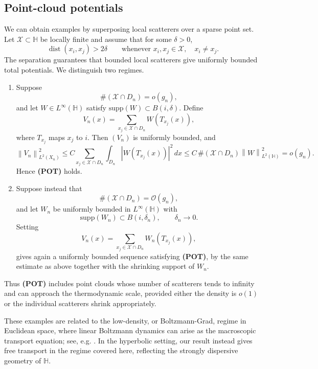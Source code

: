 \documentclass[11pt,twoside,reqno]{amsart}
\newcommand{\dist}{\operatorname{dist}}
\newcommand{\1}{\mathrm{\mathbf{1}}}
\newcommand{\supp}{\mathrm{supp}}
\newcommand{\norm}[1]{\left\lVert#1\right\rVert}
\numberwithin{equation}{section}
\theoremstyle{plain}
\theoremstyle{definition}
\theoremstyle{remark}
\begin{document}
\subsection{Point-cloud potentials}

We can obtain examples by superposing local scatterers over a sparse point
set. Let $\mathcal X\subset\mathbb H$ be locally finite and assume that for
some $\delta>0$,
\[
    \dist(x_i,x_j)>2\delta
    \qquad
    \text{whenever }x_i,x_j\in\mathcal X,\quad x_i\neq x_j.
\]
The separation guarantees that bounded local scatterers give uniformly
bounded total potentials. We distinguish two regimes.

\begin{enumerate}
    \item
    Suppose
    \[
        \#(\mathcal X\cap D_n)=o(g_n),
    \]
    and let $W\in L^\infty(\mathbb H)$ satisfy
    $\supp(W)\subset B(i,\delta)$. Define
    \[
        V_n(x)
        =
        \sum_{x_j\in\mathcal X\cap D_n}
        W(T_{x_j}(x)),
    \]
    where $T_{x_j}$ maps $x_j$ to $i$. Then $(V_n)$ is uniformly bounded,
    and
    \begin{equation}
        \norm{V_n}_{L^2(X_n)}^2
        \leq
        C
        \sum_{x_j\in\mathcal X\cap D_n}
        \int_{D_n}|W(T_{x_j}(x))|^2\,dx
        \leq
        C\,\#(\mathcal X\cap D_n)\norm{W}_{L^2(\mathbb H)}^2
        =
        o(g_n).
        \label{eq:point-cloud-L2}
    \end{equation}
    Hence \textbf{(POT)} holds.

    \item
    Suppose instead that
    \[
        \#(\mathcal X\cap D_n)=\mathcal O(g_n),
    \]
    and let $W_n$ be uniformly bounded in $L^\infty(\mathbb H)$ with
    \[
        \supp(W_n)\subset B(i,\delta_n),
        \qquad
        \delta_n\to0.
    \]
    Setting
    \[
        V_n(x)
        =
        \sum_{x_j\in\mathcal X\cap D_n}
        W_n(T_{x_j}(x)),
    \]
    gives again a uniformly bounded sequence satisfying \textbf{(POT)}, by
    the same estimate as above together with the shrinking support of $W_n$.
\end{enumerate}

Thus \textbf{(POT)} includes point clouds whose number of scatterers tends to
infinity and can approach the thermodynamic scale, provided either the density
is $o(1)$ or the individual scatterers shrink appropriately.

These examples are related to the low-density, or Boltzmann-Grad, regime in
Euclidean space, where linear Boltzmann dynamics can arise as the macroscopic
transport equation; see, e.g.
\cite{EngErdoslinearboltzmann2005,
mikkelsen2023schrodingerevolutionlowdensityrandom,
BreteauxlinearBoltzmann2014,LinearBoltzmannErdosYau2000}.
In the hyperbolic setting, our result instead gives free transport in the
regime covered here, reflecting the strongly dispersive geometry of
$\mathbb H$.
\end{document}
